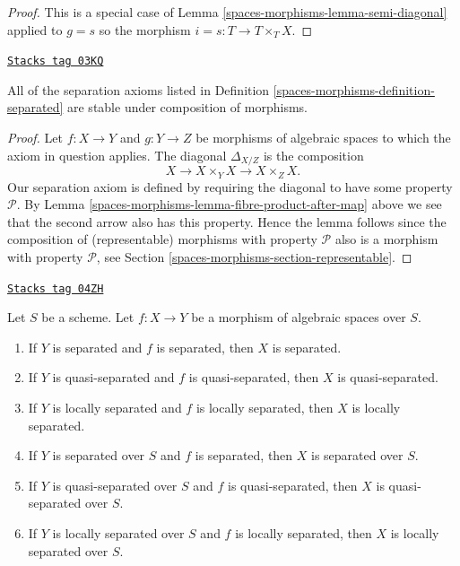 \begin{proof}
This is a special case of Lemma \ref{spaces-morphisms-lemma-semi-diagonal} applied to
$g = s$ so the morphism $i = s : T \to T \times_T X$.
\end{proof}

\begin{lemma}
\label{spaces-morphisms-lemma-composition-separated}
\href{https://stacks.math.columbia.edu/tag/03KQ}{\texttt{Stacks tag 03KQ}}

All of the separation axioms listed in Definition \ref{spaces-morphisms-definition-separated}
are stable under composition of morphisms.
\end{lemma}

\begin{proof}
Let $f : X \to Y$ and $g : Y \to Z$ be morphisms of algebraic spaces
to which the axiom in question applies.
The diagonal $\Delta_{X/Z}$ is the composition
$$
X \longrightarrow X \times_Y X \longrightarrow X \times_Z X.
$$
Our separation axiom is defined by requiring the diagonal
to have some property $\mathcal{P}$. By
Lemma \ref{spaces-morphisms-lemma-fibre-product-after-map} above we see that
the second arrow also has this property. Hence the lemma follows
since the composition of (representable) morphisms with property
$\mathcal{P}$ also is a morphism with property $\mathcal{P}$, see
Section \ref{spaces-morphisms-section-representable}.
\end{proof}

\begin{lemma}
\label{spaces-morphisms-lemma-separated-over-separated}
\href{https://stacks.math.columbia.edu/tag/04ZH}{\texttt{Stacks tag 04ZH}}

Let $S$ be a scheme.
Let $f : X \to Y$ be a morphism of algebraic spaces over $S$.
\begin{enumerate}
\item If $Y$ is separated and $f$ is separated, then $X$ is separated.
\item If $Y$ is quasi-separated and $f$ is quasi-separated, then
$X$ is quasi-separated.
\item If $Y$ is locally separated and $f$ is locally separated, then
$X$ is locally separated.
\item If $Y$ is separated over $S$ and $f$ is separated, then
$X$ is separated over $S$.
\item If $Y$ is quasi-separated over $S$ and $f$ is quasi-separated, then
$X$ is quasi-separated over $S$.
\item If $Y$ is locally separated over $S$ and $f$ is locally separated, then
$X$ is locally separated over $S$.
\end{enumerate}
\end{lemma}

